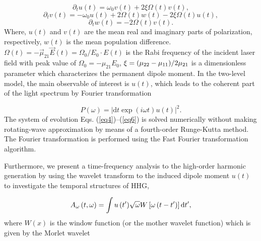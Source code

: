 \documentclass[10pt,letterpaper]{article}
\begin{document}
\begin{equation}
 {\partial _t}{u}\left( {t} \right) = {\omega _0}{v}\left( t \right) + 2\xi \Omega \left( t \right){v}\left( t \right),
\label{eq4}
\end{equation}
\begin{equation}
{\partial _t}{v}\left( {t} \right) =  - {\omega _0}{u}\left( t \right) + 2\Omega \left( t \right){w}\left( t \right) - 2\xi \Omega \left( t \right){u}\left( t \right),
\label{eq5}
\end{equation}
\begin{equation}
{\partial _t}{w}\left( {t} \right) =  - 2\Omega \left( t \right){v}\left( t \right).
\label{eq6}
\end{equation}
Where, $ u(t) $ and $ v(t) $ are the mean real and imaginary parts of polarization, respectively, $ w(t) $ is the mean population difference. $\Omega\left( t \right) = - \vec{\mu}_{21}\vec{E}\left(t\right)=\Omega_{0}/E_{0}\cdot E\left(t\right)$ is the Rabi frequency of the incident laser field with peak value of ${\Omega _0} =  - {\mu _{21}}{E_0}$, $\xi  = {{\left( {{\mu _{22}} - {\mu _{11}}} \right)} \mathord{\left/{\vphantom {{\left( {{\mu _{22}} - {\mu _{11}}} \right)} {2{\mu _{21}}}}} \right.\kern-\nulldelimiterspace} {2{\mu _{21}}}}$ is a dimensionless parameter which characterizes the permanent dipole moment. In the two-level model, the main observable of interest is $u(t)$, which leads to the coherent part of the light spectrum by Fourier transformation

\begin{equation}
P(\omega)= \left| \textrm{d}t\exp(i\omega t)u(t)\right|^2.
\label{eq7}
\end{equation}
The system of evolution Eqs. (\ref{eq4})--(\ref{eq6}) is solved numerically without making rotating-wave approximation by means of a fourth-order Runge-Kutta method. The Fourier transformation is performed using the Fast Fourier transformation algorithm.

Furthermore, we present a time-frequency analysis to the high-order harmonic generation by using the wavelet transform to the induced dipole moment ${u}\left( t \right)$ to investigate the temporal structures of HHG,

\begin{equation}
{A_\omega }\left( {t,\omega } \right) = \int {{u}\left( {t'} \right)} \sqrt \omega  {W}\left[ {\omega \left( {t - t'} \right)} \right]{\rm{d}}t',
\label{eq8}
\end{equation}
where  $ {W}(x) $ is the window function (or the mother wavelet function) which is given by the Morlet wavelet \cite{CuiNi2010NJP-wavelet,MyOE2013,TongXiaoMin2000PRA-Wavelet} 
\end{document}
